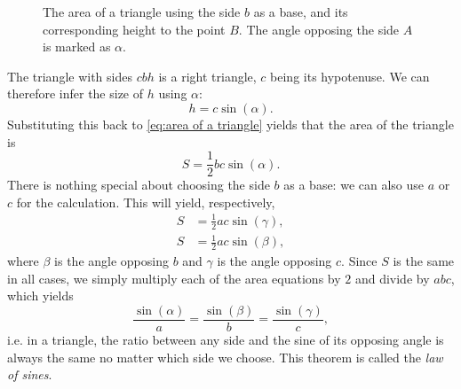\begin{figure}
	\centering
	\caption{The area of a triangle using the side $b$ as a base, and its corresponding height to the point $B$. The angle opposing the side $A$ is marked as $\alpha$.}
	\label{fig:area of a triangle}
\end{figure}

The triangle with sides $cbh$ is a right triangle, $c$ being its hypotenuse. We can therefore infer the size of $h$ using $\alpha$:
\begin{equation}
	h = c\sin(\alpha).
	\label{eq:first equation in law of sines}
\end{equation}
Substituting this back to \autoref{eq:area of a triangle} yields that the area of the triangle is
\begin{equation}
	S = \frac{1}{2}bc\sin(\alpha).
	\label{eq:area using sin theta}
\end{equation}
There is nothing special about choosing the side $b$ as a base: we can also use $a$ or $c$ for the calculation. This will yield, respectively,
\begin{align}
	S &= \frac{1}{2}ac\sin(\gamma),\\
	S &= \frac{1}{2}ac\sin(\beta),
	\label{eq:}
\end{align}
where $\beta$ is the angle opposing $b$ and $\gamma$ is the angle opposing $c$. Since $S$ is the same in all cases, we simply multiply each of the area equations by $2$ and divide by $abc$, which yields
\begin{equation}
	\frac{\sin(\alpha)}{a} = \frac{\sin(\beta)}{b} = \frac{\sin(\gamma)}{c},
	\label{eq:law of sines}
\end{equation}
i.e. in a triangle, the ratio between any side and the sine of its opposing angle is always the same no matter which side we choose. This theorem is called the \emph{law of sines}.

